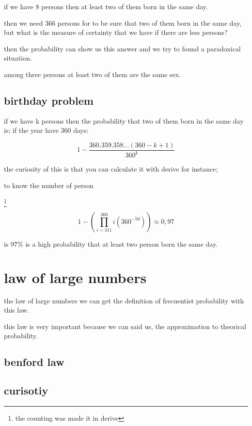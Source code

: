 \documentclass[10pt,a4paper]{article}
\begin{document}
if we have 8 persons then at least two of them born in the same day.

then we need 366 persons for to be sure that two of them born in the same day, but what is the measure of certainty that we have if there are less persons? 


then the probability can show us this answer and we try to found a paradoxical situation.



among three persons at least two of them are the same sex.



\subsection{birthday problem}

if we have k persons then the probability that two of them born in the same day is; if the year have 360 days:

$$1- \frac{360.359.358...(360-k+1)}{360^{k}}$$

the curiosity of this is that you can calculate it with derive for instance;

to know the number of person 

\footnote{the counting was made it in derive}




$$ 1 - \left( \prod_{i=311}^{360} i (360^{-50})\right)\approx 0,97 $$


is 97\%  is a high probability  that at least two person born the same day.


\section{law of large numbers}

the law of large numbers we can get the definition of frecuentist probability with this law.

this law is very important because we can said us, the approximation to theorical probability. 



\subsection{benford law}


\subsection*{curisotiy}
\end{document}
